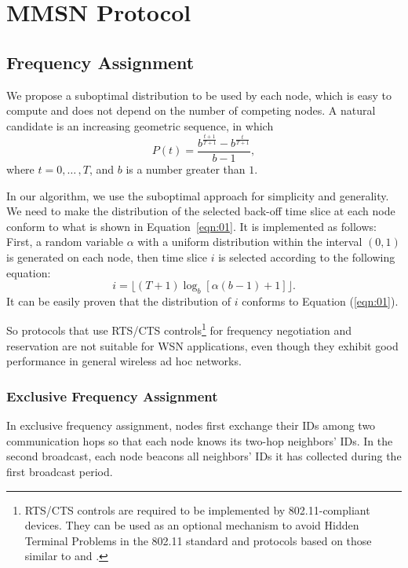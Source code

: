 \documentclass[format=acmsmall, review=false]{acmart}
\begin{document}
\section{MMSN Protocol}

\subsection{Frequency Assignment}

We propose a suboptimal distribution to be used by each node, which is
easy to compute and does not depend on the number of competing
nodes. A natural candidate is an increasing geometric sequence, in
which
\begin{equation}
\label{eqn:01}
P(t)=\frac{b^{\frac{t+1}{T+1}}-b^{\frac{t}{T+1}}}{b-1},
\end{equation}
where $t=0,{\ldots}\,,T$, and $b$ is a number greater than $1$.

In our algorithm, we use the suboptimal approach for simplicity and
generality. We need to make the distribution of the selected back-off
time slice at each node conform to what is shown in
Equation~\eqref{eqn:01}. It is implemented as follows: First, a random
variable $\alpha$ with a uniform distribution within the interval $(0,
1)$ is generated on each node, then time slice $i$ is selected
according to the following equation:
\[
i=\lfloor(T+1)\log_b[\alpha(b-1)+1]\rfloor.
\]
It can be easily proven that the distribution of $i$ conforms to Equation
(\ref{eqn:01}).

So protocols \cite{Bahl-02, Culler-01,Zhou-06,Adya-01,
	Tzamaloukas-01, Akyildiz-01} that use RTS/CTS
controls\footnote{RTS/CTS controls are required to be implemented by
	802.11-compliant devices. They can be used as an optional mechanism
	to avoid Hidden Terminal Problems in the 802.11 standard and
	protocols based on those similar to \citet{Akyildiz-01} and
	\citet{Adya-01}.} for frequency negotiation and reservation are not
suitable for WSN applications, even though they exhibit good
performance in general wireless ad hoc
networks.

\subsubsection{Exclusive Frequency Assignment}


In exclusive frequency assignment, nodes first exchange their IDs
among two communication hops so that each node knows its two-hop
neighbors' IDs. In the second broadcast, each node beacons all
neighbors' IDs it has collected during the first broadcast period.
\end{document}
